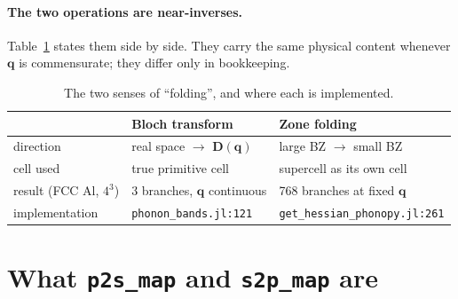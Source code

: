 \documentclass[11pt]{article}
\newcommand{\code}[1]{\texttt{\small #1}}
\newcommand{\file}[1]{\texttt{\footnotesize #1}}
\begin{document}
\paragraph{The two operations are near-inverses.} Table~\ref{tab:two} states
them side by side. They carry the same physical content whenever $\bm q$ is
commensurate; they differ only in bookkeeping.

\begin{table}[h]
\centering
\caption{The two senses of ``folding'', and where each is implemented.}
\begin{tabular}{lll}
\toprule
 & Bloch transform & Zone folding \\
\midrule
direction      & real space $\to$ $\bm D(\bm q)$ & large BZ $\to$ small BZ \\
cell used      & true primitive cell             & supercell as its own cell \\
result (FCC Al, $4^3$) & 3 branches, $\bm q$ continuous & 768 branches at fixed $\bm q$ \\
implementation & \file{phonon\_bands.jl:121}     & \file{get\_hessian\_phonopy.jl:261} \\
\bottomrule
\end{tabular}
\label{tab:two}
\end{table}

\section{What \code{p2s\_map} and \code{s2p\_map} are}
\end{document}
